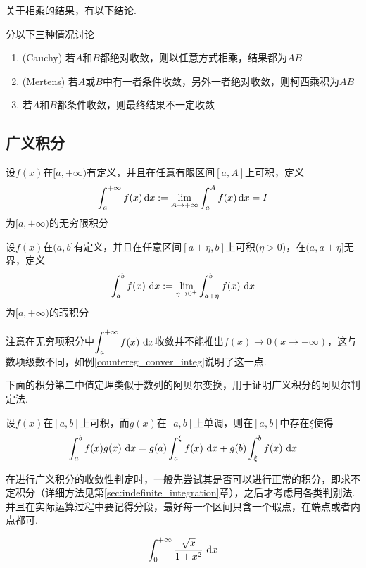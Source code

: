 \par 关于相乘的结果，有以下结论.
\begin{theorem}[级数相乘]
分以下三种情况讨论
\begin{enumerate}
	\itemsep -3pt
	\item (Cauchy) 若$A$和$B$都绝对收敛，则以任意方式相乘，结果都为$AB$
	\item (Mertens) 若$A$或$B$中有一者条件收敛，另外一者绝对收敛，则柯西乘积为$AB$
	\item 若$A$和$B$都条件收敛，则最终结果不一定收敛
\end{enumerate}
\end{theorem}


\subsection{广义积分}
\begin{definition}[无穷限积分]
设$f(x)$在$[a,+\infty)$有定义，并且在任意有限区间$[a,A]$上可积，定义
\[\int_a^{+\infty}f(x)\,\mathrm{d} x:=\lim_{A\to+\infty}\int_a^Af(x)\,\mathrm{d} x=I\]
为$[a,+\infty)$的无穷限积分
\end{definition}
\begin{definition}[瑕积分]
设$f(x)$在$(a,b]$有定义，并且在任意区间$[a+\eta,b]$上可积($\eta>0$)，在$(a,a+\eta]$无界，定义
\[\displaystyle\int_{a}^{b}{f(x)}\,\,\mathrm{d} x:=\lim_{\eta\to0^+}\displaystyle\int_{a+\eta}^{b}{f(x)}\,\,\mathrm{d} x\]
为$[a,+\infty)$的瑕积分
\end{definition}
\par 注意在无穷项积分中$\displaystyle\int_{a}^{+\infty}{f(x)}\,\,\mathrm{d} x$收敛并不能推出$f(x)\to0(x\to+\infty)$，这与数项级数不同，如例\ref{countereg_conver_integ}说明了这一点.
\par 下面的积分第二中值定理类似于数列的阿贝尔变换，用于证明广义积分的阿贝尔判定法.
\begin{theorem}[积分第二中值定理]
设$f(x)$在$[a,b]$上可积，而$g(x)$在$[a,b]$上单调，则在$[a,b]$中存在$\xi$使得
\[\displaystyle\int_{a}^{b}{f(x)g(x)}\,\,\mathrm{d} x=g(a)\displaystyle\int_{a}^{\xi}{f(x)}\,\,\mathrm{d} x+g(b)\displaystyle\int_{\xi}^{b}{f(x)}\,\,\mathrm{d} x\]
\end{theorem}
\par 在进行广义积分的收敛性判定时，一般先尝试其是否可以进行正常的积分，即求不定积分（详细方法见第\ref{sec:indefinite_integration}章），之后才考虑用各类判别法. 并且在实际运算过程中要记得分段，最好每一个区间只含一个瑕点，在端点或者内点都可.
\begin{example}
\[\displaystyle\int_{0}^{+\infty}{\dfrac{\sqrt{x}}{1+x^2}}\,\,\mathrm{d} x\]
\end{example}
